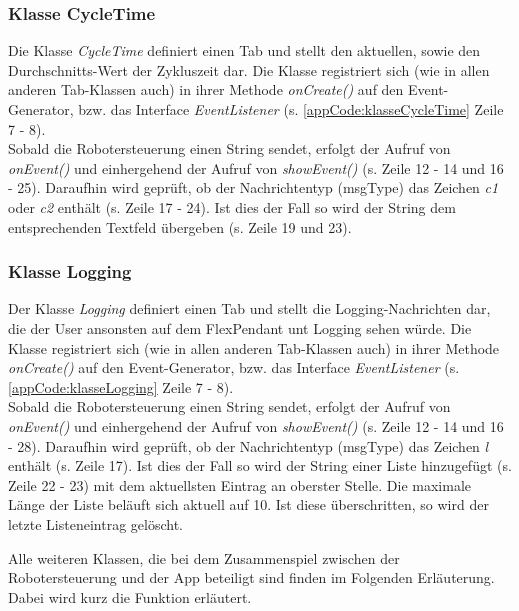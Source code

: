 \subsubsection{Klasse CycleTime}
Die Klasse \textit{CycleTime} definiert einen Tab und stellt den 
aktuellen, sowie den Durchschnitts-Wert der Zykluszeit dar. Die Klasse 
registriert sich (wie in allen anderen 
Tab-Klassen auch) in ihrer 
Methode \textit{onCreate()} auf den Event-Generator, bzw. das Interface 
\textit{EventListener} (s. \ref{appCode:klasseCycleTime} Zeile 7 - 8).\\
Sobald die Robotersteuerung einen String sendet, erfolgt der Aufruf von 
\textit{onEvent()} und einhergehend der Aufruf von \textit{showEvent()} (s. 
Zeile 12 - 14 und 16 - 25). Daraufhin wird geprüft, ob der Nachrichtentyp 
(msgType) das Zeichen \textit{c1} oder \textit{c2} enthält (s. Zeile 17 - 24). 
Ist dies der Fall so wird der 
String dem entsprechenden Textfeld übergeben (s. Zeile 19 und 23).



\subsubsection{Klasse Logging}
Der Klasse \textit{Logging} definiert einen Tab und stellt die 
Logging-Nachrichten dar, die der User ansonsten auf dem FlexPendant unt Logging 
sehen würde. Die Klasse 
registriert sich (wie in allen anderen 
Tab-Klassen auch) in ihrer 
Methode \textit{onCreate()} auf den Event-Generator, bzw. das Interface 
\textit{EventListener} (s. \ref{appCode:klasseLogging} Zeile 7 - 8).\\
Sobald die Robotersteuerung einen String sendet, erfolgt der Aufruf von 
\textit{onEvent()} und einhergehend der Aufruf von \textit{showEvent()} (s. 
Zeile 12 - 14 und 16 - 28). Daraufhin wird geprüft, ob der Nachrichtentyp 
(msgType) das Zeichen \textit{l} enthält (s. Zeile 17). 
Ist dies der Fall so wird der 
String einer Liste hinzugefügt (s. Zeile 22 - 23) mit dem aktuellsten Eintrag 
an oberster Stelle. Die maximale Länge der Liste beläuft sich aktuell auf 10. 
Ist diese überschritten, so wird der letzte Listeneintrag gelöscht.



Alle weiteren Klassen, die bei dem Zusammenspiel zwischen der Robotersteuerung 
und der App beteiligt sind finden im Folgenden Erläuterung. Dabei wird kurz die 
Funktion erläutert.

